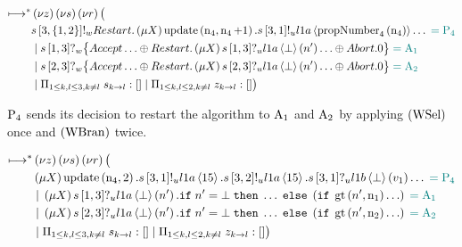 \begin{align*}
\longmapsto^*& \left(\nu z\right)\left(\nu s\right)\left(\nu r\right) \big (\\
&
    s\left[3, \left\{1,2\right\}\right]!_w \mathnormal{Restart}.
    \left(\mu X\right)
    \operatorname{update} \left(\operatorname{n}_4, \operatorname{n}_4 + 1\right).
    s\left[3, 1\right]!_u l1a \left\langle \operatorname{propNumber}_4\left( \operatorname{n}_4\right) \right\rangle\ldots
    \;\textcolor{teal}{= \operatorname{P_{4}}}\\
&\; | \;
    s\left[1, 3\right]?_w \big\{
        \mathnormal{Accept} \ldots
        \oplus
            \mathnormal{Restart} .
            \left(\mu X\right) s\left[1, 3\right]?_u l1a \left\langle \bot \right\rangle \left(n'\right)\ldots
        \oplus \mathnormal{Abort} . 0
    \big\} \;\textcolor{teal}{= \operatorname{A_{1}}}\\
&\; | \;
    s\left[2, 3\right]?_w \big\{
        \mathnormal{Accept} \ldots
        \oplus
            \mathnormal{Restart} .
            \left(\mu X\right) s\left[2, 3\right]?_u l1a \left\langle \bot \right\rangle \left(n'\right)\ldots
        \oplus \mathnormal{Abort} . 0
    \big\} \;\textcolor{teal}{= \operatorname{A_{2}}}\\
&\; | \; \Pi_{1 \le k,l \le 3, k \neq l}\; s_{k\to l}:[]
\; | \; \Pi_{1 \le k,l \le 2, k \neq l}\; z_{k\to l}:[]
\big )
\end{align*}

$\operatorname{P_{4}}$ sends its decision to restart the algorithm to $\operatorname{A_{1}}$ and $\operatorname{A_{2}}$ by applying $\left(\operatorname{WSel}\right)$ once and $\left(\operatorname{WBran}\right)$ twice.

\begin{align*}
\longmapsto^*& \left(\nu z\right)\left(\nu s\right)\left(\nu r\right) \big (\\
&
    \left(\mu X\right)
    \operatorname{update} \left(\operatorname{n}_4, 2\right).
    s\left[3, 1\right]!_u l1a \left\langle 15 \right\rangle.
    s\left[3, 2\right]!_u l1a \left\langle 15 \right\rangle.
    s\left[3, 1\right]?_u l1b \left\langle \bot \right\rangle \left(v_1\right)\ldots
    \;\textcolor{teal}{= \operatorname{P_{4}}}\\
&\; | \;
    \left(\mu X\right)
    s\left[1, 3\right]?_u l1a \left\langle \bot \right\rangle \left(n'\right).
    \mathtt{if}\; n' = \bot
    \;\mathtt{then}\; \ldots
    \;\mathtt{else}\;
        \left(
            \mathtt{if}\; \operatorname{gt}\left(n', \operatorname{n}_1\right)
            \ldots
        \right)
    \;\textcolor{teal}{= \operatorname{A_{1}}}\\
&\; | \;
    \left(\mu X\right)
    s\left[2, 3\right]?_u l1a \left\langle \bot \right\rangle \left(n'\right).
    \mathtt{if}\; n' = \bot
    \;\mathtt{then}\; \ldots
    \;\mathtt{else}\;
        \left(
            \mathtt{if}\; \operatorname{gt}\left(n', \operatorname{n}_2\right)
            \ldots
        \right)
    \;\textcolor{teal}{= \operatorname{A_{2}}}\\
&\; | \; \Pi_{1 \le k,l \le 3, k \neq l}\; s_{k\to l}:[]
\; | \; \Pi_{1 \le k,l \le 2, k \neq l}\; z_{k\to l}:[]
\big )
\end{align*}

